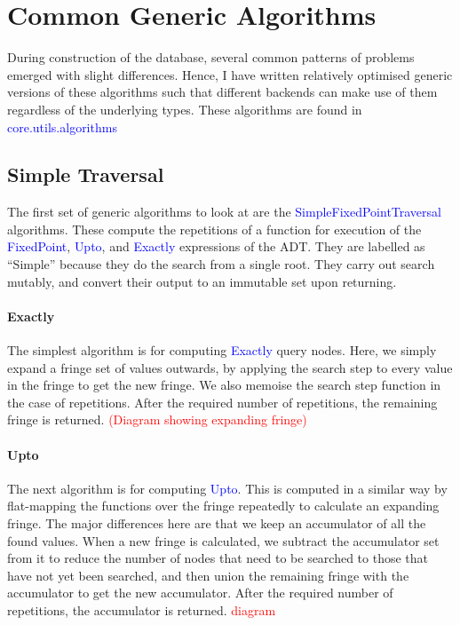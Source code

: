 \documentclass[12pt,a4paper,twoside,openright]{report}
\newcommand\todo[1]{\textcolor{red}{#1}}
\newcommand\codeName[1]{\textcolor{blue}{#1}}
\begin{document}
\section{Common Generic Algorithms}
During construction of the database, several common patterns of problems emerged with slight differences. Hence, I have written relatively optimised generic versions of these algorithms such that different backends can make use of them regardless of the underlying types. These algorithms are found in \codeName{core.utils.algorithms}


	\subsection{Simple Traversal}
	The first set of generic algorithms to look at are the \codeName{SimpleFixedPointTraversal} algorithms. These compute the repetitions of a function for execution of the \codeName{FixedPoint}, \codeName{Upto}, and \codeName{Exactly} expressions of the ADT. They are labelled as “Simple” because they do the search from a single root. They carry out search mutably, and convert their output to an immutable set upon returning.
	
		\paragraph{Exactly}
The simplest algorithm is for computing \codeName{Exactly} query nodes. Here, we simply expand a fringe set of values outwards, by applying the search step to every value in the fringe to get the new fringe. We also memoise the search step function in the case of repetitions. After the required number of repetitions, the remaining fringe is returned. \todo{(Diagram showing expanding fringe)}
    
    		\paragraph{Upto}
The next algorithm is for computing \codeName{Upto}. This is computed in a similar way by flat-mapping the functions over the fringe repeatedly to calculate an expanding fringe. The major differences here are that we keep an accumulator of all the found values. When a new fringe is calculated, we subtract the accumulator set from it to reduce the number of nodes that need to be searched to those that have not yet been searched, and then union the remaining fringe with the accumulator to get the new accumulator. After the required number of repetitions, the accumulator is returned. \todo{diagram}
	
\end{document}
